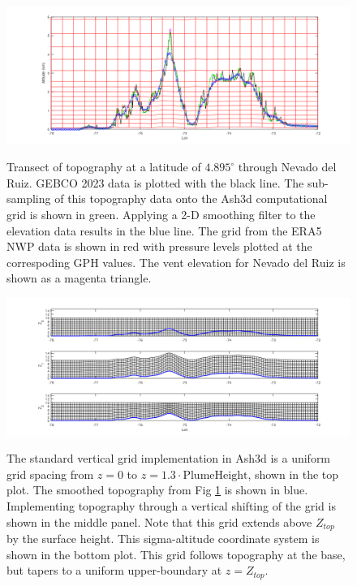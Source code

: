 \begin{figure}[htbp]\vspace*{0cm}\hspace*{0cm}
\includegraphics[angle=0,scale=0.4]{Figures/Apx_Topo/TopoRaw_Met.png}\\
\parbox{15cm}{\caption{\label{FigTopo_profile}
Transect of topography at a latitude of $4.895^{\circ}$ through Nevado del Ruiz.
GEBCO 2023 data is plotted with the black line. The sub-sampling of this topography
data onto the Ash3d computational grid is shown in green. Applying a 2-D smoothing filter
to the elevation data results in the blue line. The grid from the ERA5 NWP data is shown
in red with pressure levels plotted at the correspoding GPH values. The vent elevation
for Nevado del Ruiz is shown as a magenta triangle.
}}
\end{figure}



\begin{figure}[htbp]\vspace*{0cm}\hspace*{0cm}
\includegraphics[angle=0,scale=0.4]{Figures/Apx_Topo/Topo_Grids.png}\\
\parbox{15cm}{\caption{\label{FigTopo_grids}
The standard vertical grid implementation in Ash3d is a uniform grid spacing from $z=0$
to $z=1.3 \cdot \mathrm{PlumeHeight}$, shown in the top plot. The smoothed topography from
Fig \ref{FigTopo_profile} is shown in blue. Implementing topography through a vertical
shifting of the grid is shown in the middle panel. Note that this grid extends above
$Z_{top}$ by the surface height. This sigma-altitude coordinate system is shown in the
bottom plot. This grid follows topography at the base, but tapers to a uniform upper-boundary
at $z=Z_{top}$.
}}
\end{figure}

